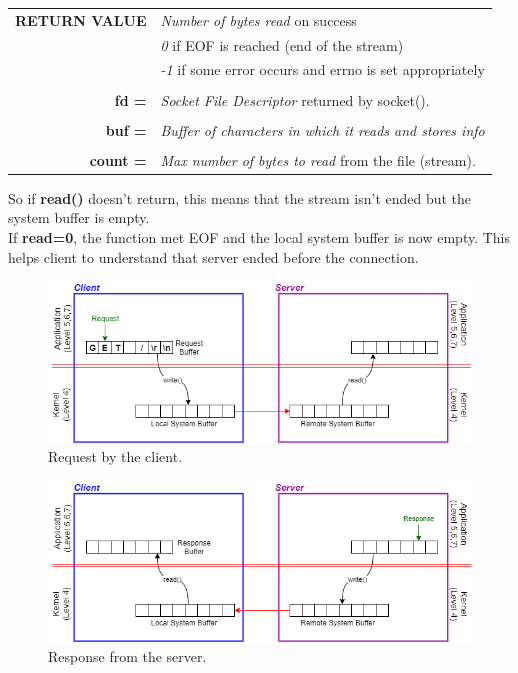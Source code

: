 \begin{table}[h]
\centering
\begin{tabular}{rcl}
\textbf{RETURN VALUE} & \multicolumn{2}{l}{\textit{Number of bytes read} on success}\\
{} & \multicolumn{2}{l}{\textit{0} if EOF is reached (end of the stream)}\\
{} & \multicolumn{2}{l}{\textit{-1} if some error occurs and errno is set appropriately}\\
& & \\
\textbf{fd =} & \multicolumn{2}{l}{\textit{Socket File Descriptor} returned by socket().}\\
& &\\
\textbf{buf =} & \multicolumn{2}{l}{\textit{Buffer of characters in which it reads and stores info}}\\
& & \\
\textbf{count =} & \multicolumn{2}{l}{\textit{Max number of bytes to read} from the file (stream).}
\end{tabular}
\end{table}
So if \textbf{read()} doesn't return, this means that the stream isn't ended but the system buffer is empty.\\
If \textbf{read=0}, the function met EOF and the local system buffer is now empty. This helps client to understand that server ended before the connection.

\begin{figure}[h]
\centering
\includegraphics[scale=0.5]{Images/NetworkC/read_write1}\caption{\footnotesize{Request by the client.}}\label{rw1}
\end{figure}

\begin{figure}[h]
\centering
\includegraphics[scale=0.5]{Images/NetworkC/read_write2}\caption{\footnotesize{Response from the server.}}\label{rw2}
\end{figure}

